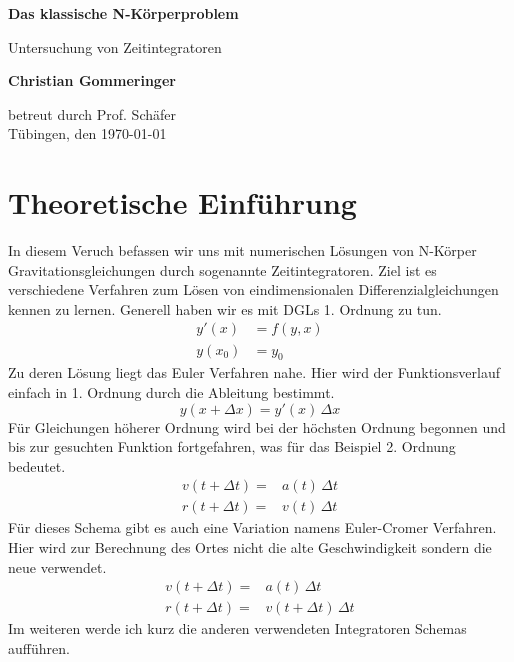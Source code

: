 \documentclass[12pt]{article}
\begin{document}
\newcommand{\half}{\frac{1}{2}}
\begin{titlepage}
    \begin{center}
        \vspace*{1cm}
            
        \Huge
        \textbf{Das klassische N-Körperproblem}
            
        
        \large
        
            
        \vspace{0.7cm}
            Untersuchung von Zeitintegratoren
        \vspace{2cm}
        

        \textbf{Christian Gommeringer}
            
        \vspace*{7cm}
        
        
            
        
              
        
            
        
            
        \normalsize
        betreut durch Prof. Schäfer\\
        \vspace*{1cm}
        Tübingen, den \today
        
            
    \end{center}
\end{titlepage}

\section*{Theoretische Einführung}
In diesem Veruch befassen wir uns mit numerischen Lösungen von N-Körper Gravitationsgleichungen durch sogenannte Zeitintegratoren. Ziel ist es verschiedene Verfahren zum Lösen von eindimensionalen Differenzialgleichungen kennen zu lernen. Generell haben wir es mit DGLs 1. Ordnung zu tun.
\begin{align*}y'(x)&=f(y,x)\\
    y(x_0)&=y_0
\end{align*}
Zu deren Lösung liegt das Euler Verfahren nahe. Hier wird der Funktionsverlauf einfach in 1. Ordnung durch die Ableitung bestimmt.
$$y(x+\Delta{x})=y'(x)\,\Delta{x}$$
Für Gleichungen höherer Ordnung wird bei der höchsten Ordnung begonnen und bis zur gesuchten Funktion fortgefahren, was für das Beispiel 2. Ordnung bedeutet.
\begin{align*}
    v(t+\Delta{t})=&a(t)\,\Delta{t}\\
    r(t+\Delta{t})=&v(t)\,\Delta{t}
\end{align*}
Für dieses Schema gibt es auch eine Variation namens Euler-Cromer Verfahren. Hier wird zur Berechnung des Ortes nicht die alte Geschwindigkeit sondern die neue verwendet.
\begin{align*}
    v(t+\Delta{t})=&a(t)\,\Delta{t}\\
    r(t+\Delta{t})=&v(t+\Delta{t})\,\Delta{t}
\end{align*}
Im weiteren werde ich kurz die anderen verwendeten Integratoren Schemas aufführen.
\end{document}
